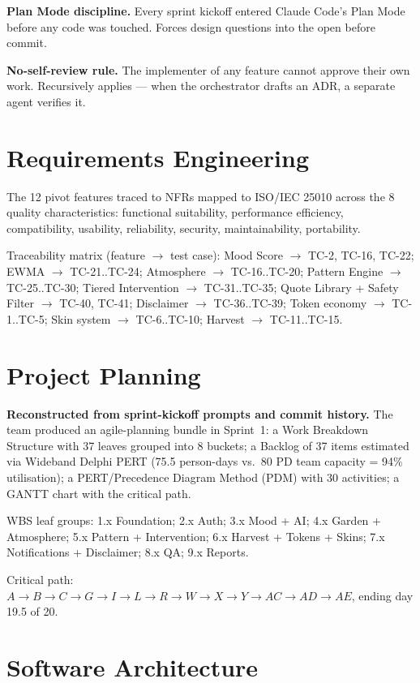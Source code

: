 \documentclass[11pt,a4paper]{article}
\begin{document}
\textbf{Plan Mode discipline.} Every sprint kickoff entered Claude Code's
Plan Mode before any code was touched. Forces design questions into the
open before commit.

\textbf{No-self-review rule.} The implementer of any feature cannot
approve their own work. Recursively applies --- when the orchestrator
drafts an ADR, a separate agent verifies it.

\section{Requirements Engineering}

The 12 pivot features traced to NFRs mapped to ISO/IEC 25010 across the
8 quality characteristics: functional suitability, performance
efficiency, compatibility, usability, reliability, security,
maintainability, portability.

Traceability matrix (feature $\to$ test case): Mood Score $\to$ TC-2,
TC-16, TC-22; EWMA $\to$ TC-21..TC-24; Atmosphere $\to$ TC-16..TC-20;
Pattern Engine $\to$ TC-25..TC-30; Tiered Intervention $\to$
TC-31..TC-35; Quote Library + Safety Filter $\to$ TC-40, TC-41;
Disclaimer $\to$ TC-36..TC-39; Token economy $\to$ TC-1..TC-5; Skin
system $\to$ TC-6..TC-10; Harvest $\to$ TC-11..TC-15.

\section{Project Planning}

\noindent\textbf{Reconstructed from sprint-kickoff prompts and commit
history.} The team produced an agile-planning bundle in Sprint~1: a Work
Breakdown Structure with 37 leaves grouped into 8 buckets; a Backlog of
37 items estimated via Wideband Delphi PERT (75.5 person-days vs.\ 80
PD team capacity = 94\% utilisation); a PERT/Precedence Diagram Method
(PDM) with 30 activities; a GANTT chart with the critical path.

WBS leaf groups: 1.x Foundation; 2.x Auth; 3.x Mood + AI; 4.x Garden +
Atmosphere; 5.x Pattern + Intervention; 6.x Harvest + Tokens + Skins;
7.x Notifications + Disclaimer; 8.x QA; 9.x Reports.

Critical path: $A \to B \to C \to G \to I \to L \to R \to W \to X \to Y
\to AC \to AD \to AE$, ending day 19.5 of 20.

\section{Software Architecture}
\end{document}
